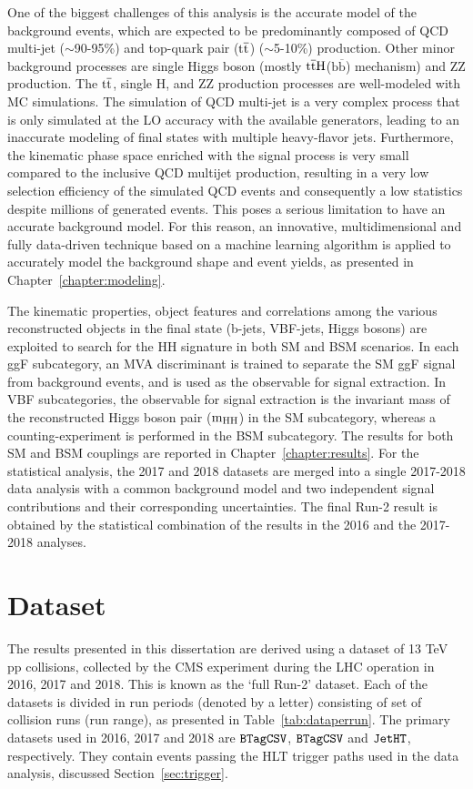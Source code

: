 One of the biggest challenges of this analysis is the accurate model of the background events, which are expected to be predominantly composed of QCD multi-jet ($\sim$90-95\%) and top-quark pair ($\mathrm{t\overline{t}}$) ($\sim$5-10\%) production. Other minor background processes are single Higgs boson (mostly $\mathrm{t\overline{t}H}$($\mathrm{b\overline{b}}$) mechanism) and ZZ production. The $\mathrm{t\overline{t}}$, single H, and ZZ production processes are well-modeled with MC simulations. The simulation of QCD multi-jet is a very complex process that is only simulated at the LO accuracy with the available generators, leading to an inaccurate modeling of final states with multiple heavy-flavor jets. Furthermore, the kinematic phase space enriched with the signal process is very small compared to the inclusive QCD multijet production, resulting in a very low selection efficiency of the simulated QCD events and consequently a low statistics despite millions of generated events. This poses a serious limitation to have an accurate background model. For this reason, an innovative, multidimensional and fully data-driven technique based on a machine learning algorithm is applied to accurately model the background shape and event yields, as presented in Chapter~\ref{chapter:modeling}.

The kinematic properties, object features and correlations among the various reconstructed objects in the final state (b-jets, VBF-jets, Higgs bosons) are exploited to search for the HH signature in both SM and BSM scenarios. In each ggF subcategory, an MVA discriminant is trained to separate the SM ggF signal from background events, and is used as the observable for signal extraction. In VBF subcategories, the observable for signal extraction is the invariant mass of the reconstructed Higgs boson pair ($\mathrm{m_{HH}}$) in the SM subcategory, whereas a counting-experiment is performed in the BSM subcategory. The results for both SM and BSM couplings are reported in Chapter~\ref{chapter:results}. For the statistical analysis, the 2017 and 2018 datasets are merged into a single 2017-2018 data analysis with a common background model and two independent signal contributions and their corresponding uncertainties. The final Run-2 result is obtained by the statistical combination of the results in the 2016 and the 2017-2018 analyses.

\section{Dataset}\label{sec:dataset}
The results presented in this dissertation are derived using a dataset of 13 TeV pp collisions, collected by the CMS experiment during the LHC operation in 2016, 2017 and 2018. This is known as the `full Run-2' dataset. Each of the datasets is divided in run periods (denoted by a letter) consisting of set of collision runs (run range), as presented in Table~\ref{tab:dataperrun}. The primary datasets used in 2016, 2017 and 2018 are $\verb|BTagCSV|$, $\verb|BTagCSV|$ and $\verb|JetHT|$, respectively. They contain events passing the HLT trigger paths used in the data analysis, discussed Section~\ref{sec:trigger}.

